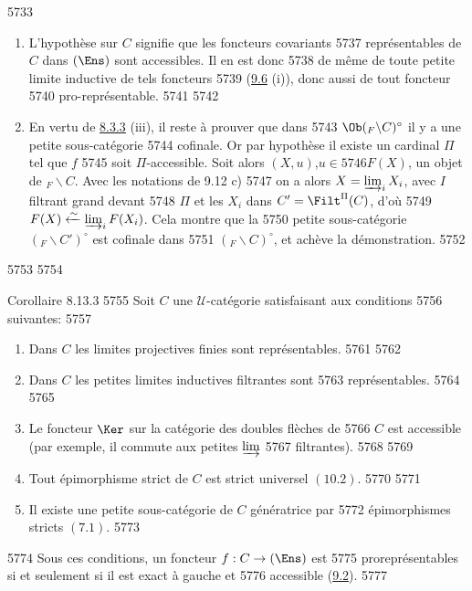   5733	\begin{enumerate}
  5734	\renewcommand{\theenumi}{\alph{enumi}}
  5735	\renewcommand{\labelenumi}{\theenumi)}
  5736	\item L'hypothèse sur $C$ signifie que les foncteurs covariants
  5737	représentables de $C$ dans $(\Ens)$ sont accessibles. Il en est donc
  5738	de même de toute petite limite inductive de tels foncteurs
  5739	(\hyperref[I.prop9.6]{9.6} (i)), donc aussi de tout foncteur
  5740	pro-représentable.
  5741	
  5742	\item En vertu de \hyperref[I.them8.3.3]{8.3.3} (iii), il reste à prouver que dans
  5743	$\Ob({}_F\backslash C)^\circ$ il y a une petite sous-catégorie
  5744	cofinale. Or par hypothèse il existe un cardinal $\Pi$ tel que $f$
  5745	soit $\Pi$-accessible. Soit alors $(X,u)$,\pageoriginale $u\in
  5746	F(X)$, un objet de ${}_F\backslash C$. Avec les notations de 9.12 c)
  5747	on a alors $X=\varinjlim_i X_i$, avec $I$ filtrant grand devant
  5748	$\Pi$ et les $X_i$ dans $C'=\Filt^{\Pi}(C)$, d'où
  5749	$F(X)\xleftarrow{\sim}\varinjlim_i F(X_i)$. Cela montre que la
  5750	petite sous-catégorie $({}_F\backslash C')^\circ$ est cofinale dans
  5751	$({}_F\backslash C)^\circ$, et achève la démonstration.
  5752	\end{enumerate}
  5753	
  5754	\begin{enonce*}{Corollaire 8.13.3}
  5755	Soit $C$ une $𝒰$-catégorie satisfaisant aux conditions
  5756	suivantes:
  5757	\begin{enumerate}
  5758	\renewcommand{\theenumi}{\alph{enumi}}
  5759	\renewcommand{\labelenumi}{\theenumi)}
  5760	\item Dans $C$ les limites projectives finies sont représentables.
  5761	
  5762	\item Dans $C$ les petites limites inductives filtrantes sont
  5763	représentables.
  5764	
  5765	\item Le foncteur $\Ker$ sur la catégorie des doubles flèches de
  5766	$C$ est accessible (par exemple, il commute aux petites $\varinjlim$
  5767	filtrantes).
  5768	
  5769	\item Tout épimorphisme strict de $C$ est strict universel $(10.2)$.
  5770	
  5771	\item Il existe une petite sous-catégorie de $C$ génératrice par
  5772	épimorphismes stricts $(7.1)$.
  5773	\end{enumerate}
  5774	Sous ces conditions, un foncteur $f:C\rightarrow (\Ens)$ est
  5775	proreprésentables si et seulement si il est exact à gauche et
  5776	accessible (\hyperref[I.def9.2]{9.2}).
  5777	\end{enonce*}
